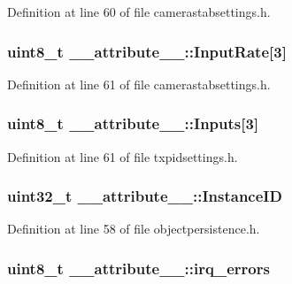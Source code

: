 \-Definition at line 60 of file camerastabsettings.\-h.

\hypertarget{struct____attribute_____ad477f87dda5a05f08d7b2e9e60e43d66}{
\subsubsection[{\-Input\-Rate}]{\setlength{\rightskip}{0pt plus 5cm}uint8\-\_\-t {\bf \-\_\-\-\_\-attribute\-\_\-\-\_\-\-::\-Input\-Rate}\mbox{[}3\mbox{]}}}\label{struct____attribute_____ad477f87dda5a05f08d7b2e9e60e43d66}


\-Definition at line 61 of file camerastabsettings.\-h.

\hypertarget{struct____attribute_____ab90a241b02b4df877fdb2c5ee6a85143}{
\subsubsection[{\-Inputs}]{\setlength{\rightskip}{0pt plus 5cm}uint8\-\_\-t {\bf \-\_\-\-\_\-attribute\-\_\-\-\_\-\-::\-Inputs}\mbox{[}3\mbox{]}}}\label{struct____attribute_____ab90a241b02b4df877fdb2c5ee6a85143}


\-Definition at line 61 of file txpidsettings.\-h.

\hypertarget{struct____attribute_____a1c564790a90a4716b8018747eca90ce0}{
\subsubsection[{\-Instance\-I\-D}]{\setlength{\rightskip}{0pt plus 5cm}uint32\-\_\-t {\bf \-\_\-\-\_\-attribute\-\_\-\-\_\-\-::\-Instance\-I\-D}}}\label{struct____attribute_____a1c564790a90a4716b8018747eca90ce0}


\-Definition at line 58 of file objectpersistence.\-h.

\hypertarget{struct____attribute_____a802f451ff215b7db49584ae0db52dd80}{
\subsubsection[{irq\-\_\-errors}]{\setlength{\rightskip}{0pt plus 5cm}uint8\-\_\-t {\bf \-\_\-\-\_\-attribute\-\_\-\-\_\-\-::irq\-\_\-errors}}}\label{struct____attribute_____a802f451ff215b7db49584ae0db52dd80}


